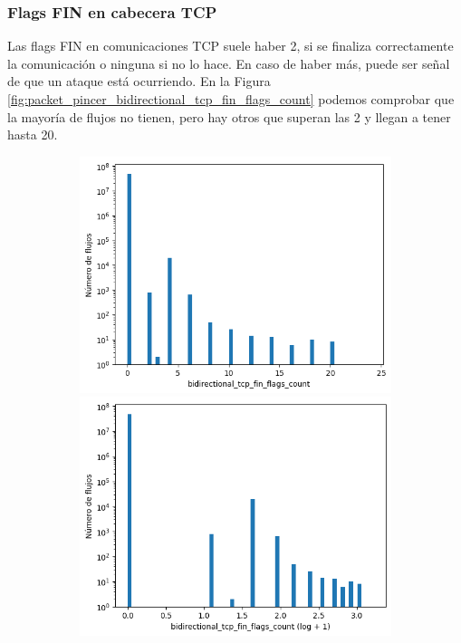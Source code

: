 \subsubsection{Flags FIN en cabecera TCP}

Las flags FIN en comunicaciones TCP suele haber 2, si se finaliza correctamente la comunicación o ninguna si no lo hace. En caso de haber más, puede ser señal de que un ataque está ocurriendo. En la Figura \ref{fig:packet_pincer_bidirectional_tcp_fin_flags_count} podemos comprobar que la mayoría de flujos no tienen, pero hay otros que superan las 2 y llegan a tener hasta 20.

\begin{figure}[H]
    \centering
    \begin{subfigure}[b]{0.32\textwidth}
        \centering
        \includegraphics[width=\textwidth]{media/packet_pincer_cicddos/bidirectional_tcp_fin_flags_count_linear_x_log_y.png}
        \includegraphics[width=\textwidth]{media/packet_pincer_cicddos/bidirectional_tcp_fin_flags_count_log_x_log_y.png}

\end{subfigure}
\end{figure}
